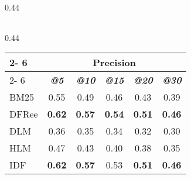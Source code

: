 \begin{table*}[]
\begin{small}
\begin{subtable}[b]{0.44\textwidth}
\begin{tabular}{l|c|c|c|c|c}
 	  	\hline
 	  	\end{tabular}
 	  	
 	  	
 	  	 \end{subtable}

 	 \vspace{0.5cm}
  	  	\begin{subtable}[b]{0.44\textwidth}
 	  	 	
 	  	  	\centering
 	  	  	\caption{All collections} 
 	  	 
 	  	 	\begin{tabular}{l|c|c|c|c|c} 
 	  	 	
 	  	 	\cline{2- 6}
 	  	 	\multicolumn{1}{c}{}&\multicolumn{5}{c}{Precision} \\ 
 	  	 	\cline{2- 6} &
 	  	 	\textit{\textbf{@5}} & 
 	  	 	\textit{\textbf{@10}} & 
 	  	 	\textit{\textbf{@15}} & 
 	  	 	\textit{\textbf{@20}} & 
 	  	 	\textit{\textbf{@30}} 
 	  	 	
 	  	 	\tabularnewline
 	  	 	\hline
 	 	 	 BM25 & 0.55 & 0.49 & 0.46 & 0.43 & 0.39 \\
 	 	 	 DFRee  & \textbf{0.62} & \textbf{0.57} & \textbf{0.54} & \textbf{0.51} & \textbf{0.46} \\
 	 	 	 DLM  & 0.36 & 0.35 & 0.34 & 0.32 & 0.30 \\
 	 	 	 HLM  & 0.47 & 0.43 & 0.40 & 0.38 & 0.35 \\
 	 	 	 IDF  & \textbf{0.62} & \textbf{0.57} & 0.53 & \textbf{0.51} & \textbf{0.46} \\
 	  	 
 	  	  	\hline
 	  	  	\end{tabular}
 	  	  	
 	  	 
 	  	  	
 	\end{subtable}
 	 
 	 
  	\label{traditional}
  	  \vspace{0.7cm}
  	  \end{small}
 \end{table*}